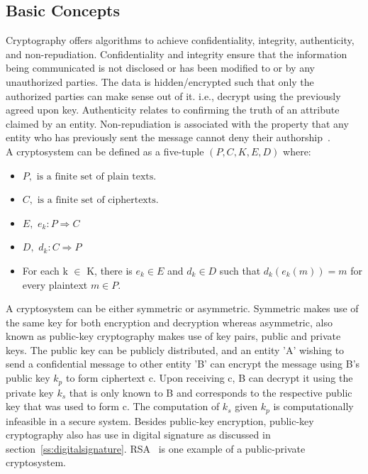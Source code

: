 \subsection{Basic Concepts}
Cryptography offers algorithms to achieve confidentiality, integrity,
authenticity, and non-repudiation. Confidentiality and integrity ensure that
the information being communicated is not disclosed or has been modified to or
by any unauthorized parties. The data is hidden/encrypted such that only the
authorized parties can make sense out of it. i.e., decrypt using the previously
agreed upon key. Authenticity relates to confirming the truth of an attribute
claimed by an entity. Non-repudiation is associated with the property that any
entity who has previously sent the message cannot deny their
authorship~\cite{katz1996handbook}. \\ 
A cryptosystem can be defined as a five-tuple $\displaystyle(P, C, K, E, D)$ where: 
\begin{itemize}
	\item $\displaystyle P, \text{ is a finite set of plain texts. }$
	\item $\displaystyle C, \text{ is a finite set of ciphertexts. } $
	\item $\displaystyle E,$ 
		$\displaystyle e_{k}:P \Rightarrow C$
	\item $\displaystyle D,$ 
		$\displaystyle d_{k}:C  \Rightarrow P$ 
	\item For each k $\displaystyle \in$ K, there is $\displaystyle e_k \in E$
		and $\displaystyle d_k \in D$ such that $\displaystyle d_k(e_k(m)) = m$
		for every plaintext $\displaystyle m \in P$.
\end{itemize}

A cryptosystem can be either symmetric or asymmetric. Symmetric makes use of
the same key for both encryption and decryption whereas asymmetric, also known
as public-key cryptography makes use of key pairs, public and private keys. The
public key can be publicly distributed, and an entity 'A' wishing to send a
confidential message to other entity 'B' can encrypt the message using B's
public key $k_{p}$ to form ciphertext c. Upon receiving c, B can decrypt it
using the private key $k_{s}$ that is only known to B and corresponds to the
respective public key that was used to form c. The computation of $k_{s}$ given
$k_{p}$ is computationally infeasible in a secure system. Besides public-key
encryption, public-key cryptography also has use in digital signature as
discussed in section~\ref{ss:digitalsignature}. RSA~\cite{rivest1978method} is
one example of a public-private cryptosystem.

